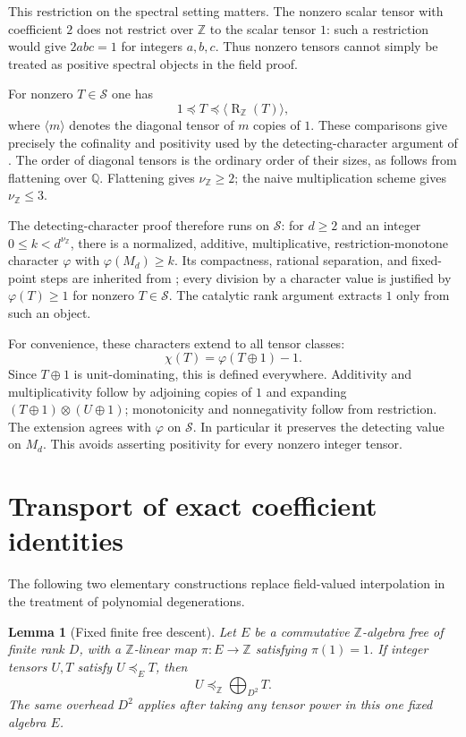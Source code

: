 \documentclass[11pt]{article}
\newtheorem{lemma}[theorem]{Lemma}
\theoremstyle{remark}
\DeclareMathOperator{\rk}{R}
\newcommand{\Z}{\mathbb Z}
\newcommand{\Q}{\mathbb Q}
\newcommand{\res}{\preceq}
\numberwithin{equation}{section}
\begin{document}
This restriction on the spectral setting matters. The nonzero scalar
tensor with coefficient $2$ does not restrict over $\Z$ to the scalar
tensor $1$: such a restriction would give $2abc=1$ for integers $a,b,c$.
Thus nonzero tensors cannot simply be treated as positive spectral
objects in the field proof.

For nonzero $T\in\mathcal S$ one has
\[
 1\res T\res\langle\rk_\Z(T)\rangle,
\]
where $\langle m\rangle$ denotes the diagonal tensor of $m$ copies of
$1$. These comparisons give precisely the cofinality and positivity used
by the detecting-character argument of \cite[Appendix~A]{OAI}.
The order of diagonal tensors is the ordinary order of their sizes,
as follows from flattening over $\Q$. Flattening gives $\nu_\Z\geq2$; the naive multiplication scheme gives
$\nu_\Z\leq3$.

The detecting-character proof therefore runs on $\mathcal S$: for
$d\geq2$ and an integer $0\leq k<d^{\nu_\Z}$, there is a normalized,
additive, multiplicative, restriction-monotone character $\varphi$ with
$\varphi(M_d)\geq k$. Its compactness, rational separation, and fixed-point
steps are inherited from \cite{OAILean}; every division by a character
value is justified by $\varphi(T)\geq1$ for nonzero $T\in\mathcal S$.
The catalytic rank argument extracts $1$ only from such an object.

For convenience, these characters extend to all tensor classes:
\begin{equation}\label{eq:extend}
 \chi(T)=\varphi(T\oplus1)-1.
\end{equation}
Since $T\oplus1$ is unit-dominating, this is defined everywhere.
Additivity and multiplicativity follow by adjoining copies of $1$ and
expanding $(T\oplus1)\otimes(U\oplus1)$; monotonicity and nonnegativity
follow from restriction. The extension agrees with $\varphi$ on
$\mathcal S$. In particular it preserves the detecting value on $M_d$.
This avoids asserting positivity for every nonzero integer tensor.

\section{Transport of exact coefficient identities}

The following two elementary constructions replace field-valued
interpolation in the treatment of polynomial degenerations.

\begin{lemma}[Fixed finite free descent]\label{lem:descent}
Let $E$ be a commutative $\Z$-algebra free of finite rank $D$, with a
$\Z$-linear map $\pi:E\to\Z$ satisfying $\pi(1)=1$.
If integer tensors $U,T$ satisfy $U\res_E T$, then
\[
 U\res_\Z \bigoplus_{D^2}T.
\]
The same overhead $D^2$ applies after taking any tensor power in this
one fixed algebra $E$.
\end{lemma}
\end{document}

